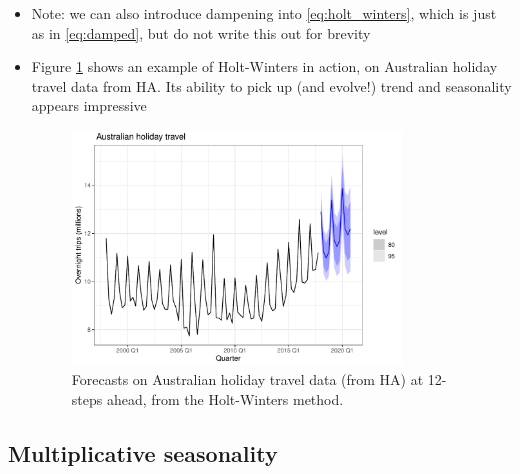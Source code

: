 \documentclass{article}
\begin{document}
\begin{itemize}
\item Note: we can also introduce dampening into \eqref{eq:holt_winters}, which
  is just as in \eqref{eq:damped}, but do not write this out for brevity

\item Figure \ref{fig:holiday} shows an example of Holt-Winters in action, on 
  Australian holiday travel data from HA. Its ability to pick up (and evolve!)
  trend and seasonality appears impressive

\begin{figure}[htb]
\centering
\includegraphics[width=0.825\textwidth]{fig/holiday-1.pdf}
\caption{Forecasts on Australian holiday travel data (from HA) at 12-steps
  ahead, from the Holt-Winters method.} 
\label{fig:holiday}
\end{figure}
\end{itemize}

\subsection{Multiplicative seasonality}
\end{document}
